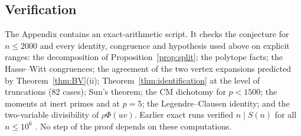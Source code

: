 \documentclass[11pt]{amsart}
\theoremstyle{definition}
\theoremstyle{remark}
\begin{document}
\subsection*{Verification}
The Appendix contains an exact-arithmetic script. It checks the conjecture for $n\le2000$ and
every identity, congruence and hypothesis used above on explicit ranges: the decomposition of
Proposition~\ref{prop:split}; the polytope facts; the Hasse--Witt congruences; the agreement of the
two vertex expansions predicted by Theorem~\ref{thm:BV}(ii); Theorem~\ref{thm:identification} at
the level of truncations (82 cases); Sun's theorem; the CM dichotomy for $p<1500$; the moments at
inert primes and at $p=5$; the Legendre--Clausen identity; and the two-variable divisibility of
$\rho\Phi(uv)$. Earlier exact runs verified $n\mid S(n)$ for all $n\le10^6$ \cite{EarlierNote}. No
step of the proof depends on these computations.
\end{document}
